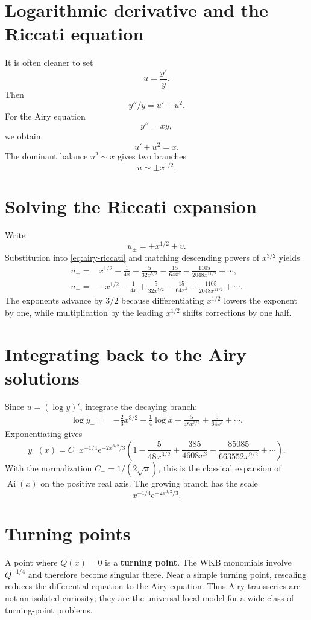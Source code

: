 \documentclass[11pt,openany]{book}
\theoremstyle{plain}
\theoremstyle{definition}
\theoremstyle{remark}
\newcommand{\e}{\mathrm{e}}
\newcommand{\defterm}[1]{\textbf{#1}}
\begin{document}
\section{Logarithmic derivative and the Riccati equation}
It is often cleaner to set
\[
  u=\frac{y'}{y}.
\]
Then
\[
  y''/y=u'+u^2.
\]
For the Airy equation
\[
  y''=xy,
  \label{eq:airy}
\]
we obtain
\[
  u'+u^2=x.
  \label{eq:airy-riccati}
\]
The dominant balance $u^2\sim x$ gives two branches
\[
  u\sim\pm x^{1/2}.
\]

\section{Solving the Riccati expansion}
Write
\[
  u_\pm=\pm x^{1/2}+v.
\]
Substitution into \cref{eq:airy-riccati} and matching descending powers of $x^{3/2}$ yields
\begin{align*}
 u_+={}&x^{1/2}-\frac1{4x}
 -\frac5{32x^{5/2}}-\frac{15}{64x^4}
 -\frac{1105}{2048x^{11/2}}+\cdots,\\
 u_-={}&-x^{1/2}-\frac1{4x}
 +\frac5{32x^{5/2}}-\frac{15}{64x^4}
 +\frac{1105}{2048x^{11/2}}+\cdots.
\end{align*}
The exponents advance by $3/2$ because differentiating $x^{1/2}$ lowers the exponent by one, while multiplication by the leading $x^{1/2}$ shifts corrections by one half.

\section{Integrating back to the Airy solutions}
Since $u=(\log y)'$, integrate the decaying branch:
\begin{align*}
  \log y_-={}&-\frac23x^{3/2}-\frac14\log x
  -\frac5{48x^{3/2}}+\frac5{64x^3}+\cdots.
\end{align*}
Exponentiating gives
\[
 y_-(x)=C_-x^{-1/4}\e^{-2x^{3/2}/3}
 \left(1-\frac5{48x^{3/2}}
 +\frac{385}{4608x^3}
 -\frac{85085}{663552x^{9/2}}+\cdots\right).
 \label{eq:airy-decay}
\]
With the normalization $C_-=1/(2\sqrt\pi)$, this is the classical expansion of $\operatorname{Ai}(x)$ on the positive real axis. The growing branch has the scale
\[
  x^{-1/4}\e^{+2x^{3/2}/3}.
\]

\section{Turning points}
A point where $Q(x)=0$ is a \defterm{turning point}. The WKB monomials involve $Q^{-1/4}$ and therefore become singular there. Near a simple turning point, rescaling reduces the differential equation to the Airy equation. Thus Airy transseries are not an isolated curiosity; they are the universal local model for a wide class of turning-point problems.
\end{document}
